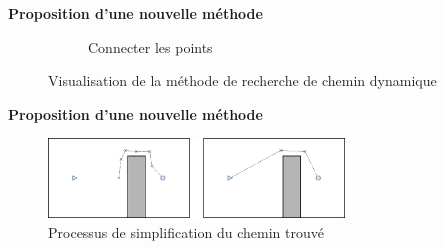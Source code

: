 \documentclass[aspectratio=169,10pt]{beamer}
\begin{document}
\begin{frame}{\textbf{Proposition d'une nouvelle méthode}}
\begin{figure}[H]
\begin{subfigure}[b]{0.3\textwidth}
			\caption{Connecter les points}
			\label{fig:idk}
		\end{subfigure}
		\caption{Visualisation de la méthode de recherche de chemin dynamique}
		\label{fig:method_visu}
	\end{figure}
\end{frame}

\begin{frame}{\textbf{Proposition d'une nouvelle méthode}}
    \begin{figure}[H]
		\centering
		\includegraphics[width=0.7\textwidth]{IMAGES/shorten_path.png}
		\caption{Processus de simplification du chemin trouvé}
		\label{fig:path_simp}
	\end{figure}
\end{frame}
\end{document}
